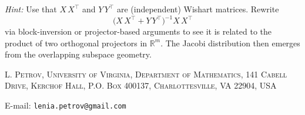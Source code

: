 \documentclass[letterpaper,11pt,oneside,reqno]{article}
\numberwithin{equation}{section}
\theoremstyle{definition}
\begin{document}
\noindent
\emph{Hint:}
Use that \(X\,X^\top\) and \(Y\,Y^\top\) are (independent) Wishart matrices. Rewrite
\[\bigl(X\,X^\top + Y\,Y^\top\bigr)^{-1}X\,X^\top\] via block-inversion or projector-based arguments to see it is related to the product of two orthogonal projectors in \(\mathbb{R}^{m}\). The Jacobi distribution then emerges from the overlapping subspace geometry.




























\medskip

\textsc{L. Petrov, University of Virginia, Department of Mathematics, 141 Cabell Drive, Kerchof Hall, P.O. Box 400137, Charlottesville, VA 22904, USA}

E-mail: \texttt{lenia.petrov@gmail.com}
\end{document}
